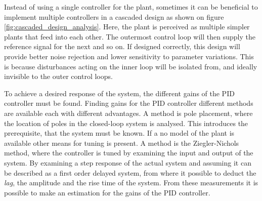 \documentclass[../../main.tex]{subfiles}
\begin{document}
Instead of using a single controller for the plant, sometimes it can be beneficial to implement multiple controllers in a cascaded design as shown on figure \ref{fig:cascaded_design_analysis}. Here, the plant is perceived as multiple simpler plants that feed into each other. The outermost control loop will then supply the reference signal for the next and so on. If designed correctly, this design will provide better noise rejection and lower sensitivity to parameter variations. This is because disturbances acting on the inner loop will be isolated from, and ideally invisible to the outer control loops.



To achieve a desired response of the system, the different gains of the PID controller must be found. Finding gains for the PID controller different methods are available each with different advantages. A method is pole placement, where the location of poles in the closed-loop system is analysed. This introduces the prerequisite, that the system must be known. If a no model of the plant is available other means for tuning is present. A method is the Ziegler-Nichols method, where the controller is tuned by examining the input and output of the system. By examining a step response of the actual system and assuming it can be described as a first order delayed system, from where it possible to deduct the \textit{lag}, the amplitude and the rise time of the system. From these measurements it is possible to make an estimation for the gains of the PID controller.
\end{document}
